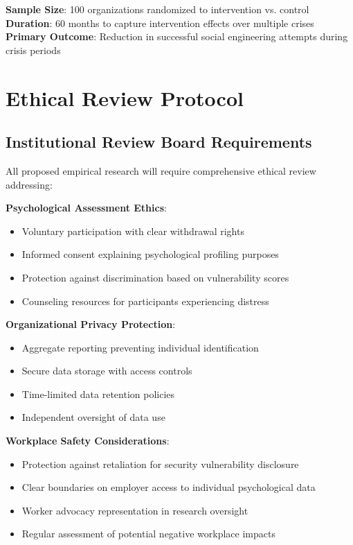 \documentclass[11pt,a4paper]{article}
\begin{document}
\textbf{Sample Size}: 100 organizations randomized to intervention vs. control
\textbf{Duration}: 60 months to capture intervention effects over multiple crises
\textbf{Primary Outcome}: Reduction in successful social engineering attempts during crisis periods

\section{Ethical Review Protocol}

\subsection{Institutional Review Board Requirements}

All proposed empirical research will require comprehensive ethical review addressing:

\textbf{Psychological Assessment Ethics}:
\begin{itemize}
\item Voluntary participation with clear withdrawal rights
\item Informed consent explaining psychological profiling purposes
\item Protection against discrimination based on vulnerability scores
\item Counseling resources for participants experiencing distress
\end{itemize}

\textbf{Organizational Privacy Protection}:
\begin{itemize}
\item Aggregate reporting preventing individual identification
\item Secure data storage with access controls
\item Time-limited data retention policies
\item Independent oversight of data use
\end{itemize}

\textbf{Workplace Safety Considerations}:
\begin{itemize}
\item Protection against retaliation for security vulnerability disclosure
\item Clear boundaries on employer access to individual psychological data
\item Worker advocacy representation in research oversight
\item Regular assessment of potential negative workplace impacts
\end{itemize}
\end{document}

